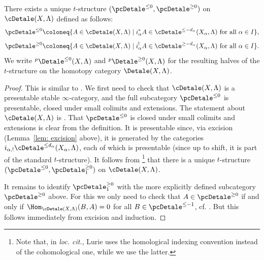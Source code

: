 \documentclass[letterpaper,11pt]{amsart}
\begin{document}
\begin{definition/proposition}{\label{defn: tstructuresonIgusaStacks}}
There exists a unique $t$-structure $(\pcDetale^{\leq 0},\pcDetale^{\geq 0})$
on $\cDetale(X,\Lambda)$ defined as follows:
\[\pcDetale^{\leq 0}\coloneq \{A \in \cDetale(X,\Lambda)\mid i_\alpha^\ast A \in \cDetale^{\leq -d_{\alpha}}(X_\alpha,\Lambda)\text{ for all $\alpha\in I$}\},\] 
\[\pcDetale^{\geq 0}\coloneq \{A \in \cDetale(X,\Lambda)\mid i_\alpha^!A \in \cDetale^{\geq -d_{\alpha}}(X_\alpha,\Lambda)\text{ for all $\alpha\in I$}\}.\] 
We write $\phantom{}^{p}\Detale^{\leq 0}(X,\Lambda)$ and $\phantom{}^{p}\Detale^{\geq 0}(X,\Lambda)$ for the resulting halves of the $t$-structure on the homotopy category $\Detale(X,\Lambda)$.
\end{definition/proposition}
\begin{proof}
This is similar to \cite[VI.7.1]{FSGeomLLC}. We first need to check that $\cDetale(X,\Lambda)$ is a presentable stable $\infty$-category, and the full subcategory $\pcDetale^{\leq 0}$ is presentable, closed under small colimits and extensions. The statement about $\cDetale(X,\Lambda)$ is \cite[Lemma 17.1]{Ecod}. That $\pcDetale^{\leq 0}$ is closed under small colimits and extensions is clear from the definition. It is presentable since, via excision (Lemma~\ref{lem: excision} above), it is generated by the categories $i_{\alpha,!}\cDetale^{\leq d_\alpha}(X_\alpha,\Lambda)$, each of which is presentable (since up to shift, it is part of the standard $t$-structure). It follows from \cite[Proposition 1.4.4.11(1)]{LurieHA}\footnote{Note that, in \textit{loc. cit.}, Lurie uses the homological indexing convention instead of the cohomological one, while we use the latter.} that there is a unique $t$-structure $(\pcDetale^{\leq 0},\pcDetale_1^{\geq 0})$ on $\cDetale(X,\Lambda)$. 

It remains to identify $\pcDetale_1^{\geq 0}$ with the more explicitly defined subcategory $\pcDetale^{\geq 0}$ above. For this we only need to check that $A\in \pcDetale^{\geq 0}$ if and only if $\Hom_{\cDetale(X,\Lambda)}(B,A)=0$ for all $B\in \pcDetale^{\leq -1}$, cf. \cite[Remark 1.2.1.3]{LurieHA}. But this follows immediately from excision and induction.
\end{proof}
\end{document}
